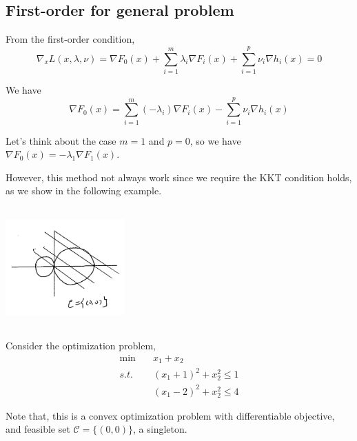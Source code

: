 \subsection{First-order for general problem}
From the first-order condition,
$$\nabla_x L(x,\lambda,\nu) = \nabla F_0(x) + \sum^m_{i=1}\lambda_i\nabla F_i(x) + \sum^p_{i=1}\nu_i \nabla h_i(x) = 0$$

We have
$$\nabla F_0(x) = \sum^m_{i=1}(-\lambda_i)\nabla F_i(x) - \sum^p_{i=1}\nu_i\nabla h_i(x)$$

Let's think about the case $m=1$ and $p=0$, so we have $\nabla F_0(x)=-\lambda_1\nabla F_1(x)$.

However, this method not always work since we require the KKT condition holds, as we show in the following example.

\begin{example}
	\begin{marginfigure}
		\centering
		\includegraphics[width=1.8in,height=1.8in]{figures/ch10/figure1204_5.png}
	\end{marginfigure}
Consider the optimization problem,
\begin{align*}
\min \quad & x_1+x_2\\
s.t. \quad & (x_1+1)^2 + x_2^2 \leq 1\\
&(x_1-2)^2 + x_2^2 \leq 4
\end{align*}

Note that, this is a convex optimization problem with differentiable objective, and feasible set $\mathcal{C}=\{(0, 0)\}$, a singleton.



\end{example}
